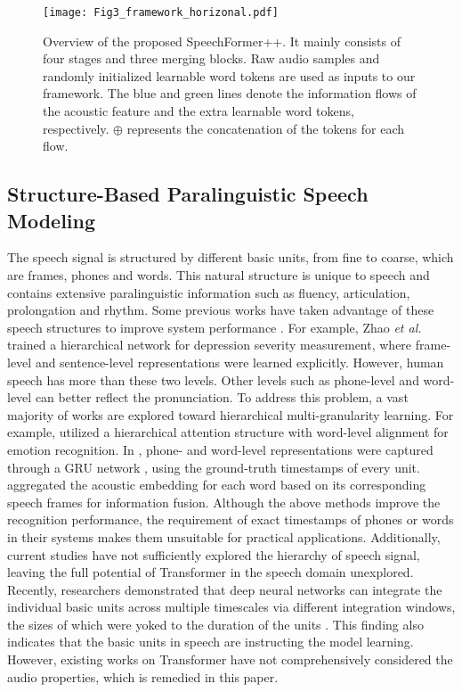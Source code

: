 \documentclass[lettersize,journal]{IEEEtran}
\begin{document}
\begin{figure*}[th]
\centering
\texttt{[image: Fig3\_framework\_horizonal.pdf]}
\caption{Overview of the proposed SpeechFormer++. It mainly consists of four stages and three merging blocks. Raw audio samples and randomly initialized learnable word tokens are used as inputs to our framework. The blue and green lines denote the information flows of the acoustic feature and the extra learnable word tokens, respectively. $\oplus$ represents the concatenation of the tokens for each flow.}
\label{fig_3}
\end{figure*}

\subsection{Structure-Based Paralinguistic Speech Modeling}
The speech signal is structured by different basic units, from fine to coarse, which are frames, phones and words. This natural structure is unique to speech and contains extensive paralinguistic information such as fluency, articulation, prolongation and rhythm. Some previous works have taken advantage of these speech structures to improve system performance \cite{reviewer2_3, reviewer2_4, speech_nature1, speech_nature2, speechformer, speech_nature3}. For example, Zhao \textit{et al.} \cite{reviewer2_3}  trained a hierarchical network for depression severity measurement, where frame-level and sentence-level representations were learned explicitly. However, human speech has more than these two levels. Other levels such as phone-level and word-level can better reflect the pronunciation. To address this problem, a vast majority of works are explored toward hierarchical multi-granularity learning. For example, \cite{reviewer2_4} utilized a hierarchical attention structure with word-level alignment for emotion recognition. In \cite{speech_nature1}, phone- and word-level representations were captured through a GRU network \cite{gru}, using the ground-truth timestamps of every unit. \cite{speech_nature2} aggregated the acoustic embedding for each word based on its corresponding speech frames for information fusion. Although the above methods improve the recognition performance, the requirement of exact timestamps of phones or words in their systems makes them unsuitable for practical applications. Additionally, current studies have not sufficiently explored the hierarchy of speech signal, leaving the full potential of Transformer in the speech domain unexplored. Recently, researchers demonstrated that deep neural networks can integrate the individual basic units across multiple timescales via different integration windows, the sizes of which were yoked to the duration of the units \cite{yoked}. This finding also indicates that the basic units in speech are instructing the model learning. However, existing works on Transformer have not comprehensively considered the audio properties, which is remedied in this paper.
\end{document}
